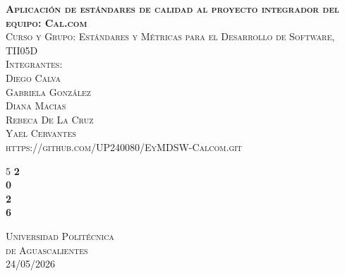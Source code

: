 \documentclass{article}
\begin{document}
\setlength{\parindent}{0pt}
\begin{titlepage}
    \thispagestyle{empty}
{\huge \textsc{\textbf{Aplicación de estándares de calidad
al proyecto integrador del equipo: Cal.com}}}\\ [10pt]
    {\Large \textsc{Curso y Grupo: Estándares y Métricas para el Desarrollo de Software, TII05D}}\\[5pt]
    {\Large \textsc{Integrantes:\\Diego Calva \\ Gabriela González\\ Diana Macias\\ Rebeca De La Cruz\\ Yael Cervantes \\https://github.com/UP240080/EyMDSW-Calcom.git}} \\ [5pt]
    \begin{minipage}{3 cm}
    \hspace{0.5 cm} 
        
    \end{minipage} \hfill
    \begin{minipage}{4 cm}
        \begin{spacing}{5}
        {\color{white} \fontsize{60}{70} \selectfont \bfseries 2\\ 0\\ 2\\ 6} 
        \end{spacing}
    \end{minipage}
    \vfill
    \begin{flushleft}
      \color{white} { {\Large \textsc{Universidad Politécnica\\ de Aguascalientes}} \\ [10pt]
        {\Large \textsc{24/05/2026}}
        }
    \end{flushleft}
\end{titlepage}

\begin{titlepage}
  \Large{\tableofcontents}

  
\end{titlepage}
\end{document}
